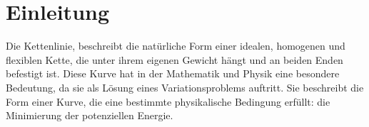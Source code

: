%
%
%
%
\section{Einleitung\label{kettenlinie:section:Einleitung}}
Die Kettenlinie, beschreibt die natürliche Form einer idealen, homogenen und flexiblen Kette, die unter ihrem eigenen Gewicht hängt und an beiden Enden befestigt ist.
Diese Kurve hat in der Mathematik und Physik eine besondere Bedeutung, da sie als Lösung eines Variationsproblems auftritt.
Sie beschreibt die Form einer Kurve, die eine bestimmte physikalische Bedingung erfüllt: die Minimierung der potenziellen Energie. 

